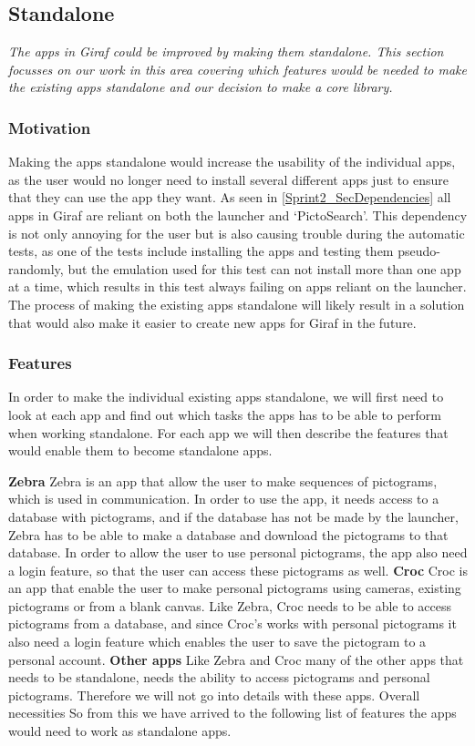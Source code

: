 \subsection{Standalone}
\textit{The apps in Giraf could be improved by making them standalone. This section focusses on our work in this area covering which features would be needed to make the existing apps standalone and our decision to make a core library.}

\subsubsection{Motivation}
Making the apps standalone would increase the usability of the individual apps, as the user would no longer need to install several different apps just to ensure that they can use the app they want. As seen in \ref{Sprint2_SecDependencies} all apps in Giraf are reliant on both the launcher and ‘PictoSearch’. This dependency is not only annoying for the user but is also causing trouble during the automatic tests, as one of the tests include installing the apps and testing them pseudo-randomly, but the emulation used for this test can not install more than one app at a time, which results in this test always failing on apps reliant on the launcher. The process of making the existing apps standalone will likely result in a solution that would also make it easier to create new apps for Giraf in the future.

\subsubsection{Features}
In order to make the individual existing apps standalone, we will first need to look at each app and find out which tasks the apps has to be able to perform when working standalone. For each app we will then describe the features that would enable them to become standalone apps. 

\textbf{Zebra}
Zebra is an app that allow the user to make sequences of pictograms, which is used in communication. In order to use the app, it needs access to a database with pictograms, and if the database has not be made by the launcher, Zebra has to be able to make a database and download the pictograms to that database. In order to allow the user to use personal pictograms, the app also need a login feature, so that the user can access these pictograms as well.
\textbf{Croc}
Croc is an app that enable the user to make personal pictograms using cameras, existing pictograms or from a blank canvas. Like Zebra, Croc needs to be able to access pictograms from a database, and since Croc’s works with personal pictograms it also need a login feature which enables the user to save the pictogram to a personal account.
\textbf{Other apps}
Like Zebra and Croc many of the other apps that needs to be standalone, needs the ability to access pictograms and personal pictograms. Therefore we will not go into details with these apps.
Overall necessities 
So from this we have arrived to the following list of features the apps would need to work as standalone apps. 

